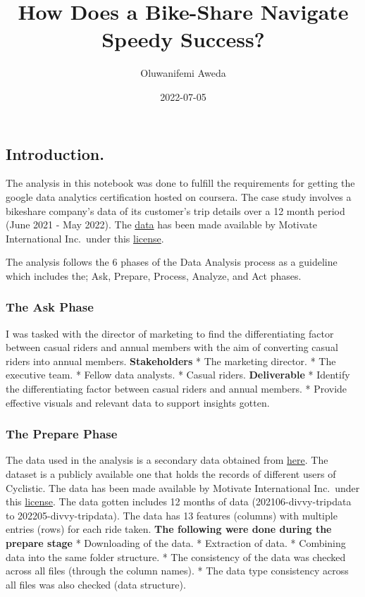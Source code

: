 \documentclass[
]{article}
\title{How Does a Bike-Share Navigate Speedy Success?}
\author{Oluwanifemi Aweda}
\date{2022-07-05}
\begin{document}
\maketitle

\hypertarget{introduction.}{%
\subsection{Introduction.}\label{introduction.}}

The analysis in this notebook was done to fulfill the requirements for
getting the google data analytics certification hosted on coursera. The
case study involves a bikeshare company's data of its customer's trip
details over a 12 month period (June 2021 - May 2022). The
\href{https://divvy-tripdata.s3.amazonaws.com/index.html}{data} has been
made available by Motivate International Inc.~under this
\href{https://ride.divvybikes.com/data-license-agreement}{license}.

The analysis follows the 6 phases of the Data Analysis process as a
guideline which includes the; Ask, Prepare, Process, Analyze, and Act
phases.

\hypertarget{the-ask-phase}{%
\subsubsection{The Ask Phase}\label{the-ask-phase}}

I was tasked with the director of marketing to find the differentiating
factor between casual riders and annual members with the aim of
converting casual riders into annual members. \textbf{Stakeholders} *
The marketing director. * The executive team. * Fellow data analysts. *
Casual riders. \textbf{Deliverable} * Identify the differentiating
factor between casual riders and annual members. * Provide effective
visuals and relevant data to support insights gotten.

\hypertarget{the-prepare-phase}{%
\subsubsection{The Prepare Phase}\label{the-prepare-phase}}

The data used in the analysis is a secondary data obtained from
\href{https://divvy-tripdata.s3.amazonaws.com/index.html}{here}. The
dataset is a publicly available one that holds the records of different
users of Cyclistic. The data has been made available by Motivate
International Inc.~under this
\href{https://ride.divvybikes.com/data-license-agreement}{license}. The
data gotten includes 12 months of data (202106-divvy-tripdata to
202205-divvy-tripdata). The data has 13 features (columns) with multiple
entries (rows) for each ride taken. \textbf{The following were done
during the prepare stage} * Downloading of the data. * Extraction of
data. * Combining data into the same folder structure. * The consistency
of the data was checked across all files (through the column names). *
The data type consistency across all files was also checked (data
structure).
\end{document}
